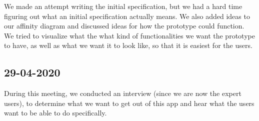 \documentclass{article}
\begin{document}
We made an attempt writing the initial specification, but we had a hard time figuring out what an initial specification actually means. We also added ideas to our affinity diagram and discussed ideas for how the prototype could function. We tried to visualize what the what kind of functionalities we want the prototype to have, as well as what we want it to look like, so that it is easiest for the users.

\subsection*{29-04-2020}
During this meeting, we conducted an interview (since we are now the expert users), to determine what we want to get out of this app and hear what the users want to be able to do specifically.
\end{document}
